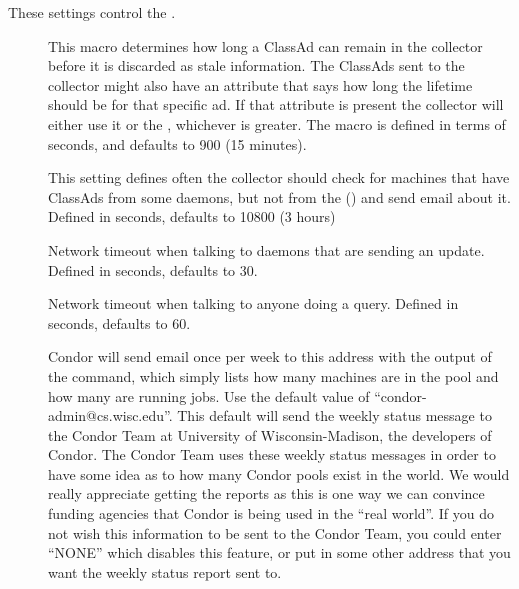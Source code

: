 These settings control the .
\begin{description}
  
\item[] \label{param:ClassadLifetime} This
  macro determines how long a ClassAd can remain in the collector
  before it is discarded as stale information.  The ClassAds sent to
  the collector might also have an attribute that says how long the
  lifetime should be for that specific ad.  If that attribute is
  present the collector will either use it or the
  , whichever is greater.  The macro is
  defined in terms of seconds, and defaults to 900 (15 minutes).
  
\item[]
  \label{param:MasterCheckInterval}  This setting defines often the
  collector should check for machines that have ClassAds from some
  daemons, but not from the  ()
  and send email about it.  Defined in seconds, defaults to 10800 (3
  hours)
  
\item[] \label{param:ClientTimeout} Network
  timeout when talking to daemons that are sending an update.  Defined
  in seconds, defaults to 30.
  
\item[] \label{param:QueryTimeout} Network
  timeout when talking to anyone doing a query. Defined in seconds,
  defaults to 60.
  
\item[] \label{param:CondorDevelopers}
  Condor will send email once per week to this address with the output
  of the  command, which simply lists how many machines
  are in the pool and how many are running jobs.  Use the default
  value of ``condor-admin@cs.wisc.edu''. This default will send the
  weekly status message to the Condor Team at University of
  Wisconsin-Madison, the developers of Condor.  The Condor Team uses
  these weekly status messages in order to have some idea as to how
  many Condor pools exist in the world.  We would really appreciate
  getting the reports as this is one way we can convince funding
  agencies that Condor is being used in the ``real world''.  If you do
  not wish this information to be sent to the Condor Team, you could
  enter ``NONE'' which disables this feature, or put in some other
  address that you want the weekly status report sent to.


\end{description}
